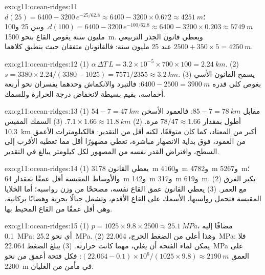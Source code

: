 \begin{solution}{exo:g11:ocean-ridges:11}
$d(25) = 6400 - 3200\,e^{-25/62.8} \approx 6400 - 3200 \times 0.672 \approx
\qty{4251}{m}$؛ $d(100) = 6400 - 3200\,e^{-100/62.8} \approx 6400 - 3200
\times 0.203 \approx \qty{5749}{m}$. وبين 25 و100 مليون سنة
يغوص القاع بنحو \qty{1500}{m}. ويعطي قانون الجذر التربيعي
$2500 + 350 \times 5 = \qty{4250}{m}$ عند 25 مليون سنة: فالقانونان
متفقان حيث ينطبق كلاهما.
\end{solution}

\begin{solution}{exo:g11:ocean-ridges:12}
(1) $\alpha\,\Delta T\,L = 3.2 \times 10^{-5} \times 700 \times 100 =
\qty{2.24}{km}$. (2) $s = 3380 \times 2.24/(3380 - 1025) = 7571/2355 \approx
\qty{3.2}{km}$. (3) يسمح القانون الأسي بغوص كلي قدره $6400 - 2500 =
\qty{3900}{m}$: فالتبرد والانكماش وحدهما يفسران نحو
أربعة أخماسه، بقيم بسيطة لانخفاض درجة الحرارة وللسمك.
\end{solution}

\begin{solution}{exo:g11:ocean-ridges:13}
(1) $54 - 7 = \qty{47}{km}$ مقابل $85 - 7 = \qty{78}{km}$: فالعمود
الأسخن أطول بمقدار $78/47 \approx 1.66$ مرة. (2) $7.1 \times 1.66 \approx
\qty{11.8}{km}$. (3) السمك المقيس \qty{10.3}{km} أكبر من المعتاد، كما
كان متوقعًا، لكنه أقل من التقدير: فالكيلومترات الأعمق من العمود،
فوق بداية الانصهار مباشرة، تعطي مصهورًا أقل مما تعطيه الأقرب إلى السطح،
وافتراض القدر نفسه من المصهور لكل كيلومتر يبالغ في التقدير.
\end{solution}

\begin{solution}{exo:g11:ocean-ridges:14}
(1) يعطي القانون \qty{3178}{m} و\qty{4160}{m} و\qty{4782}{m}
و\qty{5267}{m}؛ والأوساط المقيسة أقل عمقًا بمقدار \qty{64}{m}
و\qty{142}{m} و\qty{317}{m} و\qty{619}{m}. (2) يكبر الفرق مع
العمر. (3) يعطي القانون عمق القاع نفسه، مصححًا من وزن
رواسبه؛ أما الخلايا المقيسة فتحمل رواسبها، الأسمك على
القاع الأقدم، وتشمل جبالًا بحرية وهضابًا بركانية، وهي
أقل عمقًا من القاع المحيط بها.
\end{solution}

\begin{solution}{exo:g11:ocean-ridges:15}
(1) $p = 1025 \times 9.8 \times 2500 \approx \qty{25.1}{MPa}$، مضافًا إليه
\qty{0.1}{MPa}: أي نحو \qty{25.2}{MPa}. (2) وهذا أعلى من الضغط
الحرج، \qty{22.064}{MPa}: فلا يمكن لماء الفتحة أن يغلي، مهما كانت حرارته.
(3) يبلغ الضغط \qty{22.064}{MPa} على العمق
$(22.064 - 0.1) \times 10^6/(1025 \times 9.8) \approx \qty{2190}{m}$: فكل
فتحة أعمق من نحو \qty{2200}{m} في مأمن من الغليان.
\end{solution}

